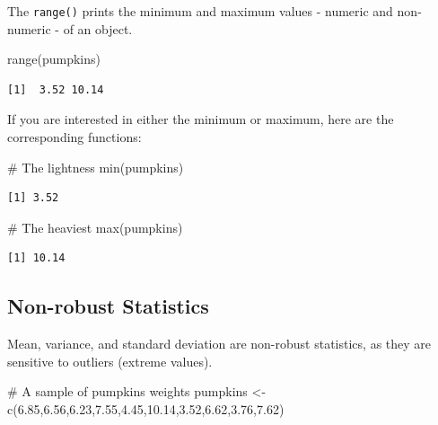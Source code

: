 \documentclass[
  letterpaper,
]{book}
\newenvironment{Shaded}{\begin{snugshade}}{\end{snugshade}}
\newcommand{\CommentTok}[1]{\textcolor[rgb]{0.37,0.37,0.37}{#1}}
\newcommand{\FloatTok}[1]{\textcolor[rgb]{0.68,0.00,0.00}{#1}}
\newcommand{\FunctionTok}[1]{\textcolor[rgb]{0.28,0.35,0.67}{#1}}
\newcommand{\NormalTok}[1]{\textcolor[rgb]{0.00,0.23,0.31}{#1}}
\newcommand{\OtherTok}[1]{\textcolor[rgb]{0.00,0.23,0.31}{#1}}
\begin{document}
The \texttt{range()} prints the minimum and maximum values - numeric and
non-numeric - of an object.

\begin{Shaded}
\begin{Highlighting}[]
\FunctionTok{range}\NormalTok{(pumpkins)}
\end{Highlighting}
\end{Shaded}

\begin{verbatim}
[1]  3.52 10.14
\end{verbatim}

If you are interested in either the minimum or maximum, here are the
corresponding functions:

\begin{Shaded}
\begin{Highlighting}[]
\CommentTok{\# The lightness}
\FunctionTok{min}\NormalTok{(pumpkins)}
\end{Highlighting}
\end{Shaded}

\begin{verbatim}
[1] 3.52
\end{verbatim}

\begin{Shaded}
\begin{Highlighting}[]
\CommentTok{\# The heaviest}
\FunctionTok{max}\NormalTok{(pumpkins)}
\end{Highlighting}
\end{Shaded}

\begin{verbatim}
[1] 10.14
\end{verbatim}

\subsection*{Non-robust Statistics}\label{non-robust-statistics}

Mean, variance, and standard deviation are non-robust statistics, as
they are sensitive to outliers (extreme values).

\begin{Shaded}
\begin{Highlighting}[]
\CommentTok{\# A sample of pumpkins\textquotesingle{} weights}
\NormalTok{pumpkins }\OtherTok{\textless{}{-}} \FunctionTok{c}\NormalTok{(}\FloatTok{6.85}\NormalTok{,}\FloatTok{6.56}\NormalTok{,}\FloatTok{6.23}\NormalTok{,}\FloatTok{7.55}\NormalTok{,}\FloatTok{4.45}\NormalTok{,}\FloatTok{10.14}\NormalTok{,}\FloatTok{3.52}\NormalTok{,}\FloatTok{6.62}\NormalTok{,}\FloatTok{3.76}\NormalTok{,}\FloatTok{7.62}\NormalTok{)}
\end{Highlighting}
\end{Shaded}
\end{document}
